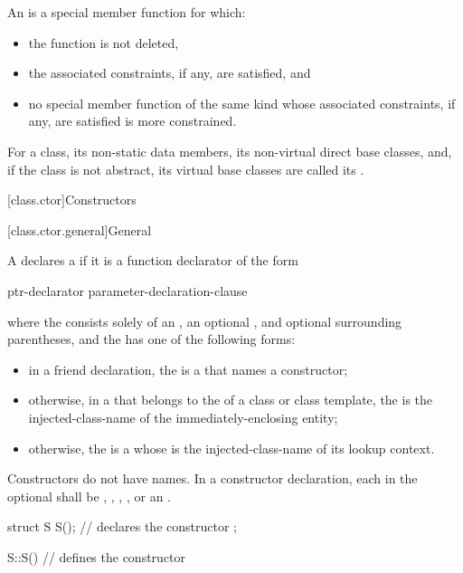 \pnum
An  is a special member function for which:
\begin{itemize}
\item the function is not deleted,
\item the associated constraints, if any, are satisfied, and
\item no special member function of the same kind
whose associated constraints, if any, are satisfied
is more constrained.
\end{itemize}

\pnum
For a class, its non-static data members, its non-virtual direct base classes,
and, if the class is not abstract, its virtual base
classes are called its .

[class.ctor]{Constructors}%

[class.ctor.general]{General}%
%
%

\pnum
A  declares a  if it is a
function declarator of the form
\begin{ncbnf}
ptr-declarator \terminal{(} parameter-declaration-clause \terminal{)}  
\end{ncbnf}
where the  consists solely of an
, an optional ,
and optional surrounding parentheses, and the  has
one of the following forms:
\begin{itemize}
\item
in a friend declaration,
the  is a 
that names a constructor;
\item
otherwise, in a  that belongs to the
 of a class or class template,
the  is the
injected-class-name of the immediately-enclosing entity;

\item
otherwise, the
 is a 
whose  is
the injected-class-name of its lookup context.
\end{itemize}
Constructors do not have names.
In a constructor declaration, each  in the optional
 shall be
,
,
,
, or
an .
\begin{example}
\begin{codeblock}
struct S {
  S();              // declares the constructor
};

S::S() { }          // defines the constructor
\end{codeblock}
\end{example}

